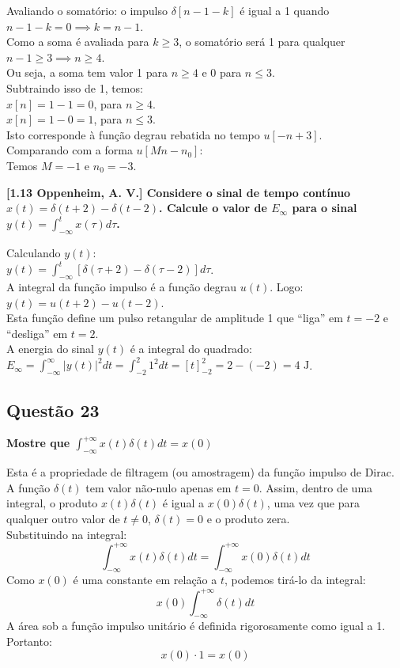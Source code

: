 Avaliando o somatório: o impulso \(\delta[n - 1 - k]\) é igual a 1 quando \(n - 1 - k = 0 \implies k = n - 1\).\\
Como a soma é avaliada para \(k \ge 3\), o somatório será 1 para qualquer \(n - 1 \ge 3 \implies n \ge 4\).\\
Ou seja, a soma tem valor 1 para \(n \ge 4\) e 0 para \(n \le 3\).\\
Subtraindo isso de 1, temos:\\
\(x[n] = 1 - 1 = 0\), para \(n \ge 4\).\\
\(x[n] = 1 - 0 = 1\), para \(n \le 3\).\\
Isto corresponde à função degrau rebatida no tempo \(u[-n + 3]\).\\
Comparando com a forma \(u[Mn - n_0]\):\\
Temos \(M = -1\) e \(n_0 = -3\).

\textbf{{[}1.13 Oppenheim, A. V.{]} Considere o sinal de tempo contínuo \(x(t) = \delta(t + 2) - \delta(t - 2)\). Calcule o valor de \(E_\infty\) para o sinal \(y(t) = \int_{-\infty}^{t} x(\tau) d\tau\).}

Calculando \(y(t)\):\\
\(y(t) = \int_{-\infty}^{t} [\delta(\tau + 2) - \delta(\tau - 2)] d\tau\).\\
A integral da função impulso é a função degrau \(u(t)\). Logo:\\
\(y(t) = u(t + 2) - u(t - 2)\).\\
Esta função define um pulso retangular de amplitude 1 que ``liga'' em \(t = -2\) e ``desliga'' em \(t = 2\).\\
A energia do sinal \(y(t)\) é a integral do quadrado:\\
\(E_\infty = \int_{-\infty}^{\infty} |y(t)|^2 dt = \int_{-2}^{2} 1^2 dt = [t]_{-2}^{2} = 2 - (-2) = 4 \text{ J}\).

\subsection{Questão 23}\label{questuxe3o-23}

\textbf{Mostre que \(\int_{-\infty}^{+\infty} x(t)\delta(t) dt = x(0)\)}

Esta é a propriedade de filtragem (ou amostragem) da função impulso de Dirac.\\
A função \(\delta(t)\) tem valor não-nulo apenas em \(t = 0\). Assim, dentro de uma integral, o produto \(x(t)\delta(t)\) é igual a \(x(0)\delta(t)\), uma vez que para qualquer outro valor de \(t \neq 0\), \(\delta(t) = 0\) e o produto zera.\\
Substituindo na integral:
\[\int_{-\infty}^{+\infty} x(t)\delta(t) dt = \int_{-\infty}^{+\infty} x(0)\delta(t) dt\]
Como \(x(0)\) é uma constante em relação a \(t\), podemos tirá-lo da integral:
\[x(0) \int_{-\infty}^{+\infty} \delta(t) dt\]
A área sob a função impulso unitário é definida rigorosamente como igual a 1.\\
Portanto:
\[x(0) \cdot 1 = x(0)\]

